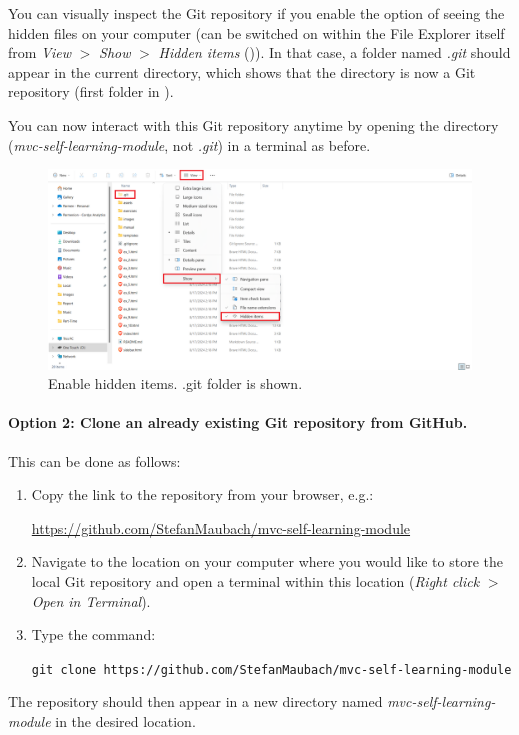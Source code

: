 \documentclass[a4paper,10pt]{article}
\begin{document}
You can visually inspect the Git repository if you enable the option of seeing the hidden files on your computer (can be switched on within the File Explorer itself from \emph{View} $>$ \emph{Show} $>$ \emph{Hidden items} ()). In that case, a folder named \emph{.git} should appear in the current directory, which shows that the directory is now a Git repository (first folder in ). 

You can now interact with this Git repository anytime by opening the directory (\emph{mvc-self-learning-module}, not \emph{.git}) in a terminal as before.

\begin{figure}[htbp]
    \centering
    \includegraphics[width=\textwidth]{hidden_items.png}
    \caption{Enable hidden items. .git folder is shown.}
    \label{fig:hidden_items}   
\end{figure}

\paragraph{Option 2: Clone an already existing Git repository from GitHub.} This can be done as follows:
\begin{enumerate}
    \item Copy the link to the repository from your browser, e.g.: 

    \url{https://github.com/StefanMaubach/mvc-self-learning-module}
    
    \item Navigate to the location on your computer where you would like to store the local Git repository and open a terminal within this location (\emph{Right click} $>$ \emph{Open in Terminal}).
    
    \item Type the command:

    \texttt{git clone https://github.com/StefanMaubach/mvc-self-learning-module}
\end{enumerate}
The repository should then appear in a new directory named \emph{mvc-self-learning-module} in the desired location. 
\end{document}
